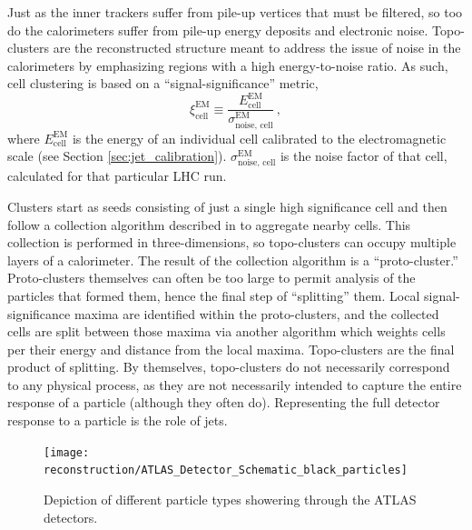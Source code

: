         Just as the inner trackers suffer from pile-up vertices that must be filtered,
            so too do the calorimeters suffer from pile-up energy deposits and electronic noise.
        Topo-clusters are the reconstructed structure meant to address the issue of noise in the calorimeters
            by emphasizing regions with a high energy-to-noise ratio.
        As such, cell clustering is based on a ``signal-significance'' metric,
            \begin{equation}
                \xi^{\textrm{EM}}_{\textrm{cell}} \equiv \frac{
                    E^{\textrm{EM}}_{\textrm{cell}} }{
                    \sigma^{\textrm{EM}}_{\textrm{noise, cell}} } \,,
            \end{equation}
            where $E^{\textrm{EM}}_{\textrm{cell}}$ is the energy of an individual cell calibrated to the electromagnetic scale
            (see Section \ref{sec:jet_calibration}).
        $\sigma^{\textrm{EM}}_{\textrm{noise, cell}}$ is the noise factor of that cell, calculated for that particular LHC run.

        Clusters start as seeds consisting of just a single high significance cell
            and then follow a collection algorithm described in \cite{cell_clustering} to aggregate nearby cells.
        This collection is performed in three-dimensions, so topo-clusters can occupy multiple layers of a calorimeter.
        The result of the collection algorithm is a ``proto-cluster.''
        Proto-clusters themselves can often be too large to permit analysis of the particles that formed them,
            hence the final step of ``splitting'' them.
        Local signal-significance maxima are identified within the proto-clusters,
            and the collected cells are split between those maxima via another algorithm
            which weights cells per their energy and distance from the local maxima.
        Topo-clusters are the final product of splitting.
        By themselves, topo-clusters do not necessarily correspond to any physical process,
            as they are not necessarily intended to capture the entire response of a particle
            (although they often do).
        Representing the full detector response to a particle is the role of jets.

        \begin{figure}[tbh]
            \texttt{[image: reconstruction/ATLAS\_Detector\_Schematic\_black\_particles]}
            \caption{
                Depiction of different particle types showering through the ATLAS detectors\cite{Mehlhase:2770815}.
            }
            \label{fig:atlas_shower}
        \end{figure}


